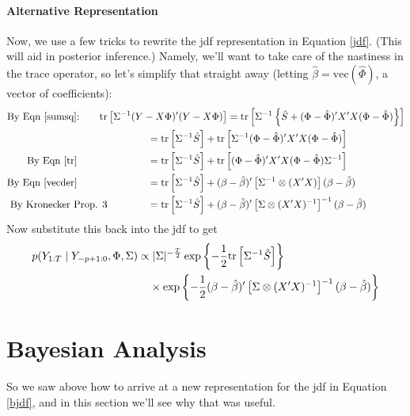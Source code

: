 \documentclass[a4paper,12pt]{scrartcl}
\begin{document}
\paragraph{Alternative Representation}
Now, we use a few tricks to rewrite the jdf representation
in Equation \ref{jdf}. (This will aid in posterior inference.)
Namely, we'll want to take care
of the nastiness in the trace operator, so let's simplify 
that straight away (letting $\hat{\beta} = 
\text{vec}(\hat{\Phi})$, a vector of coefficients):
\begin{align*}
    \text{By Eqn \ref{sumsq}:} \qquad 
	\text{tr} & \left[\Sigma^{-1} 
	(Y - X\Phi)'(Y-X\Phi)\right] = 
	\text{tr} \left[\Sigma^{-1} \left\{
	\hat{S} + (\Phi - \hat{\Phi})'
	X'X(\Phi - \hat{\Phi}) \right\}\right]  \\
    &\qquad\qquad= \text{tr} \left[\Sigma^{-1} 
	\hat{S} \right] + \text{tr} \left[ \Sigma^{-1}
	(\Phi - \hat{\Phi})'X'X(\Phi - \hat{\Phi}) \right] \\
    \text{By Eqn \ref{tr}} \qquad \quad
	&\qquad\qquad= \text{tr} \left[\Sigma^{-1}
	\hat{S} \right] + \text{tr} \left[ 
	(\Phi - \hat{\Phi})'X'X(\Phi - \hat{\Phi})
	\Sigma^{-1} \right] \\
    \text{By Eqn \ref{vecder}} \qquad \quad
	&\qquad\qquad= \text{tr} \left[\Sigma^{-1}
	\hat{S} \right] + 
	(\beta - \hat{\beta})'
	\left[\Sigma^{-1} \otimes (X'X)\right] 
	(\beta - \hat{\beta}) \\
    \text{By Kronecker Prop. 3}  
	&\qquad\qquad= \text{tr} \left[\Sigma^{-1}
	\hat{S} \right] + 
	(\beta - \hat{\beta})'
	\left[\Sigma \otimes (X'X)^{-1}\right]^{-1} 
	(\beta - \hat{\beta}) 
\end{align*}
Now substitute this back into the jdf to get
\begin{align}
    p(Y_{1:T} \; | \; Y_{-p+1:0}, \Phi, \Sigma)
    \propto 
	&\;|\Sigma|^{-\frac{T}{2}} 
	\exp\left\{ -\frac{1}{2} \text{tr} \left[\Sigma^{-1}
	\hat{S} \right] \right\} \notag \\
    &\times
	\exp\left\{ -\frac{1}{2} 
	(\beta - \hat{\beta})'
	\left[\Sigma \otimes (X'X)^{-1}\right]^{-1} 
	(\beta - \hat{\beta}) 
	\right\}  \label{bjdf}
\end{align}


\newpage
\section{Bayesian Analysis}

So we saw above how to arrive at a new representation
for the jdf in Equation \ref{bjdf}, and in this section 
we'll see why that was useful.
\end{document}
